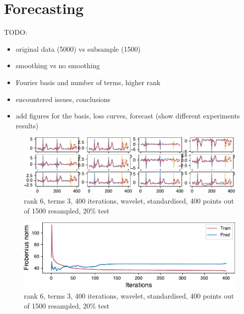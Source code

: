 \documentclass{mldsmsc}
\begin{document}
\section{Forecasting}

TODO:

\begin{itemize}
    \item original data (5000) vs subsample (1500)
    \item smoothing vs no smoothing
    \item Fourier basis and number of terms, higher rank
    \item encountered issues, conclusions
    \item add figures for the basis, loss curves, forecast (show different experiments results)
\end{itemize}

\begin{figure}[H]
\begin{center}
\includegraphics[scale=1]{images/forecast/periodic_fit.pdf}
\caption{rank 6, terms 3, 400 iterations, wavelet, standardised, 400 points out of 1500 resampled, 20\% test}
\label{forecast}
\end{center}
\end{figure}

\begin{figure}[H]
\begin{center}
\includegraphics[scale=1]{images/forecast/periodic_cost.pdf}
\caption{rank 6, terms 3, 400 iterations, wavelet, standardised, 400 points out of 1500 resampled, 20\% test}
\label{loss}
\end{center}
\end{figure}
\end{document}
